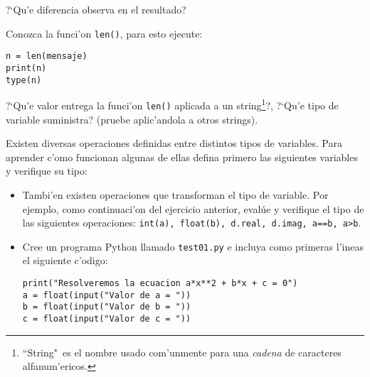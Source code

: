 \documentclass[11pt]{exam}
\begin{document}
\begin{questions}
\begin{parts}
?`Qu'e diferencia observa en el resultado?
\item Conozca la funci'on \texttt{len()}, para esto ejecute:

\begin{verbatim}
n = len(mensaje)
print(n)
type(n)
\end{verbatim}

?`Qu'e valor entrega la funci'on \texttt{len()} aplicada a un string\footnote{``String"\, es el nombre usado com'unmente para una \textit{cadena} de caracteres alfanum'ericos.}?, ?`Qu'e tipo de variable suministra? (pruebe aplic'andola a otros strings).

\end{parts}
\item Existen diversas operaciones definidas entre distintos tipos de variables. Para aprender c'omo funcionan algunas de ellas defina primero las siguientes variables y verifique su tipo:
\begin{itemize}

\begin{verbatim}
a = 3.14
b = 2
c = 5
d = 6+2j
e = "hola "
f = "mechones"
g = True
\end{verbatim}
A continuaci'on imprima el valor y el tipo del resultado de las siguientes operaciones: \texttt{a+b, a+d, a+e, b+c, b+d, b+e, f+e, e+f, a*b, a*d, a*e, b*c, b*d, c*e, e*f, a**b, a**d, a**e, b**c, e**a, e**b, e**f, a/b, a/d, a/e, b/c, b/d, b/e, c/b, d/a, d/b, e/a, e/b, e/f,  a*g, b*g, not(g), g and False, g and True, g or False, g or True}. ?`Cu'ales de estas operaciones no est'an definidas?
\item Tambi'en existen operaciones que transforman el tipo de variable. Por ejemplo, como continuaci'on del ejercicio anterior, evalúe y verifique el tipo de las siguientes operaciones: \texttt{int(a), float(b), d.real, d.imag, a==b, a>b}.

\item Cree un programa Python llamado \texttt{test01.py} e incluya como primeras l'ineas el siguiente c'odigo:

\begin{verbatim}
print("Resolveremos la ecuacion a*x**2 + b*x + c = 0")
a = float(input("Valor de a = "))
b = float(input("Valor de b = "))
c = float(input("Valor de c = "))
\end{verbatim}


\end{itemize}
\end{questions}
\end{document}
